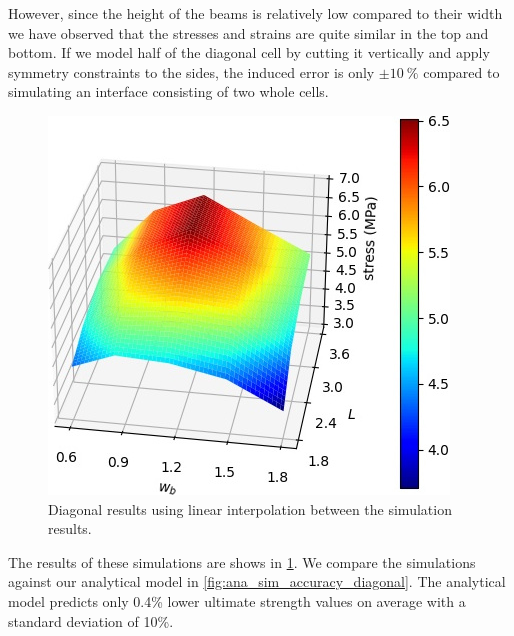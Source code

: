 However, since the height of the beams is relatively low compared to their width we have observed that the stresses and strains are quite similar in the top and bottom.
If we model half of the diagonal cell by cutting it vertically and apply symmetry constraints to the sides,
the induced error is only $\pm \SI{10}{\percent}$ compared to simulating an interface consisting of two whole cells.



\begin{figure}
	\centering
	\includegraphics[width=.7\columnwidth]{sources/simulation/diagonal_sim_response.jpg}
	\caption{Diagonal results using linear interpolation between the simulation results.}
	\label{fig:sim_diagonal_model}
\end{figure}


The results of these simulations are shows in \cref{fig:sim_diagonal_model}.
We compare the simulations against our analytical model in \cref{fig:ana_sim_accuracy_diagonal}.
The analytical model predicts only 0.4\% lower ultimate strength values on average with a standard deviation of 10\%.




